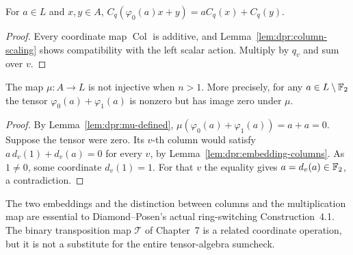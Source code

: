 \begin{lemma}\label{lem:dpr:contraction-linear}
For $a\in L$ and $x,y\in A$,
$C_q(\varphi_0(a)x+y)=aC_q(x)+C_q(y)$.
\end{lemma}
\begin{proof}
Every coordinate map $\operatorname{Col}$
is additive, and
Lemma~\ref{lem:dpr:column-scaling}
shows compatibility with the left
scalar action. Multiply by $q_v$
and sum over $v$.
\end{proof}

\begin{lemma}\label{lem:dpr:multiplication-loss}
The map $\mu:A\to L$ is not injective
when $n>1$. More precisely, for any
$a\in L\setminus\mathbb{F}_2$ the tensor
$\varphi_0(a)+\varphi_1(a)$ is nonzero
but has image zero under $\mu$.
\end{lemma}
\begin{proof}
By Lemma~\ref{lem:dpr:mu-defined},
$\mu(\varphi_0(a)+\varphi_1(a))=a+a=0$.
Suppose the tensor were zero.
Its $v$-th column would satisfy
$a\,d_v(1)+d_v(a)=0$ for every $v$,
by Lemma~\ref{lem:dpr:embedding-columns}.
As $1\ne0$, some coordinate $d_v(1)=1$.
For that $v$ the equality gives
$a=d_v(a)\in\mathbb{F}_2$, a contradiction.
\end{proof}

\begin{remark}
The two embeddings and the distinction
between columns and the multiplication map
are essential to Diamond--Posen's actual
ring-switching Construction~4.1.
The binary transposition map $\mathcal T$
of Chapter~7 is a related coordinate
operation, but it is not a substitute for
the entire tensor-algebra sumcheck.
\end{remark}
